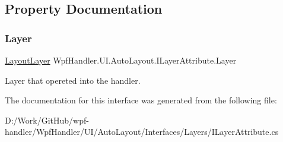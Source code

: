 \subsection{Property Documentation}
\mbox{\label{interface_wpf_handler_1_1_u_i_1_1_auto_layout_1_1_i_layer_attribute_a0af8e554e80237be99bf7927749ff49f}} 
\subsubsection{\texorpdfstring{Layer}{Layer}}
{\footnotesize\ttfamily \mbox{\hyperlink{class_wpf_handler_1_1_u_i_1_1_auto_layout_1_1_layout_layer}{Layout\+Layer}} Wpf\+Handler.\+U\+I.\+Auto\+Layout.\+I\+Layer\+Attribute.\+Layer\hspace{0.3cm}{\ttfamily [get]}}



Layer that opereted into the handler. 



The documentation for this interface was generated from the following file\+:\begin{DoxyCompactItemize}
\item 
D\+:/\+Work/\+Git\+Hub/wpf-\/handler/\+Wpf\+Handler/\+U\+I/\+Auto\+Layout/\+Interfaces/\+Layers/I\+Layer\+Attribute.\+cs\end{DoxyCompactItemize}
